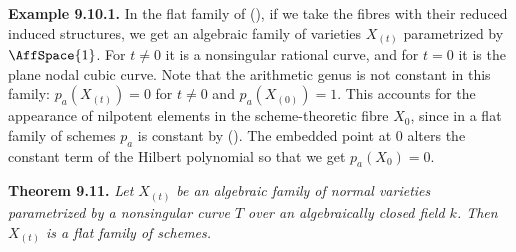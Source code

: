 {\medskip
\noindent\hypertarget{result-III-9.10.1}{}\textbf{Example 9.10.1.} In the flat family of ()\EditionText{}, if we take the fibres with their reduced induced structures, we get an algebraic family of varieties $X_{(t)}$ parametrized by $\AffSpace{1}$. For $t\ne0$ it is a nonsingular rational curve, and for $t=0$ it is the plane nodal cubic curve. Note that the arithmetic genus is not constant in this family: $p_a(X_{(t)})=0$ for $t\ne0$ and $p_a(X_{(0)})=1$. This accounts for the appearance of nilpotent elements in the scheme-theoretic fibre $X_0$, since in a flat family of schemes $p_a$ is constant by (). The embedded point at $0$ alters the constant term of the Hilbert polynomial so that we get $p_a(X_0)=0$.

\medskip
\noindent\hypertarget{result-III-9.11}{}\textbf{Theorem 9.11.} \emph{Let $X_{(t)}$ be an algebraic family of normal varieties parametrized by a nonsingular curve $T$ over an algebraically closed field $k$. Then $X_{(t)}$ is a flat family of schemes.}}
